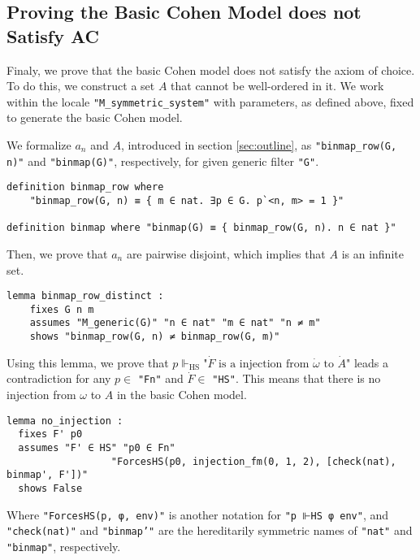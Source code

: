 \documentclass{report}
\newenvironment{isaframe}{\begin{mdframed}[topline=false, rightline=false, bottomline=false]}{\end{mdframed}}
\begin{document}
\subsection{Proving the Basic Cohen Model does not Satisfy AC}
Finaly, we prove that the basic Cohen model does not satisfy the axiom of choice.
To do this, we construct a set $A$ that cannot be well-ordered in it.
We work within the locale \texttt{"M\_symmetric\_system"} with parameters, as defined above, 
fixed to generate the basic Cohen model.

We formalize $a_n$ and $A$, introduced in section \ref{sec:outline}, 
as \texttt{"binmap\_row(G, n)"} and \texttt{"binmap(G)"}, respectively, for given generic filter \texttt{"G"}.
\begin{isaframe}
\begin{verbatim}
definition binmap_row where 
    "binmap_row(G, n) ≡ { m ∈ nat. ∃p ∈ G. p`<n, m> = 1 }"

definition binmap where "binmap(G) ≡ { binmap_row(G, n). n ∈ nat }" 
\end{verbatim}
\end{isaframe}
Then, we prove that $a_n$ are pairwise disjoint, which implies that $A$ is an infinite set.
\begin{isaframe}
\begin{verbatim}
lemma binmap_row_distinct : 
    fixes G n m 
    assumes "M_generic(G)" "n ∈ nat" "m ∈ nat" "n ≠ m" 
    shows "binmap_row(G, n) ≠ binmap_row(G, m)" 
\end{verbatim}
\end{isaframe}
Using this lemma, we prove that 
$p \Vdash_{\mathrm{HS}} \text{"} \dot{F} \text{ is a injection from } \dot{\omega} \text{ to } \dot{A} \text{"}$ leads a contradiction 
for any $p \in $ \texttt{"Fn"} and $\dot{F} \in $ \texttt{"HS"}.
This means that there is no injection from $\omega$ to $A$ in the basic Cohen model.
\begin{isaframe}
\begin{verbatim}
lemma no_injection : 
  fixes F' p0
  assumes "F' ∈ HS" "p0 ∈ Fn"  
                  "ForcesHS(p0, injection_fm(0, 1, 2), [check(nat), binmap', F'])" 
  shows False
\end{verbatim}
\end{isaframe}
Where \texttt{"ForcesHS(p, φ, env)"} is another notation for \texttt{"p ⊩HS φ env"},
and \texttt{"check(nat)"} and \texttt{"binmap'"} are the hereditarily symmetric names of \texttt{"nat"} and \texttt{"binmap"}, respectively.
\end{document}
